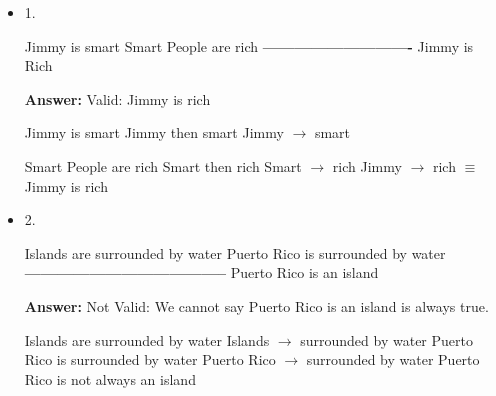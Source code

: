 \documentclass[11pt]{article}
\begin{document}
\begin{itemize}
\item 1. 

Jimmy is smart
\vskip 0.1in
Smart People are rich
\vskip 0.1in
 \textbf{----------------------------}
\vskip 0.1in
Jimmy is Rich 
 \vskip 0.1in
 
 
 \textbf{Answer:} Valid: Jimmy is rich 
 
 Jimmy is smart
\vskip 0.1in
Jimmy then smart
\vskip 0.1in
Jimmy $\to$ smart

Smart People are rich
\vskip 0.1in
Smart then rich 
\vskip 0.1in
Smart $\to$ rich 
\vskip 0.1in
Jimmy $\to$ rich $\equiv$ Jimmy is rich 

  


 \end{itemize} 
    
    
    
    
   
 
\begin{itemize}
\item 2. 

Islands are surrounded by water
\vskip 0.1in 
Puerto Rico is surrounded by water
\vskip 0.1in 
\textbf{--------------------------------------}
\vskip 0.1in 
Puerto Rico is an island
\vskip 0.1in


 \textbf{Answer:}  Not Valid: We cannot say Puerto Rico is an island is always true. 
 
 Islands are surrounded by water
 \vskip 0.1in
 Islands $\to$ surrounded by water
 \vskip 0.1in
  Puerto Rico is surrounded by water
 \vskip 0.1in
 Puerto Rico $\to$ surrounded by water
  \vskip 0.1in
  Puerto Rico is not always an island 
  
   
   
 \end{itemize} 
\end{document}
